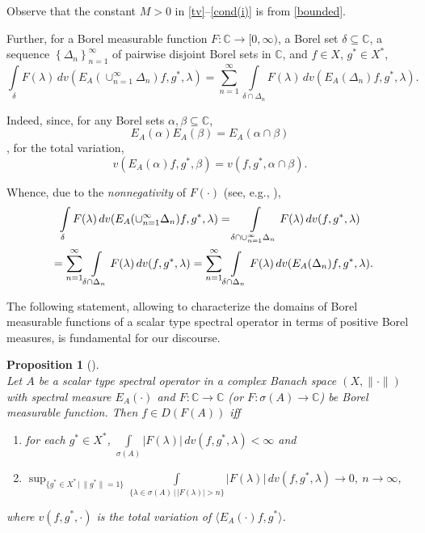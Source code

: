 \documentclass{amsart}
\theoremstyle{plain}
\newtheorem{prop}{Proposition}[section]
\theoremstyle{definition}
\begin{document}
Observe that the constant $M>0$ in \eqref{tv}--\eqref{cond(i)} is from 
\eqref{bounded}.

Further, for a Borel measurable function $F:{{\mathbb C}}\to [0,\infty)$, a Borel set $\delta\subseteq {{\mathbb C}}$, a sequence $\left\{\Delta_n\right\}_{n=1}^\infty$ 
of pairwise disjoint Borel sets in ${{\mathbb C}}$, and 
$f\in X$, $g^*\in X^*$,
\begin{equation}\label{decompose}
\int\limits_{\delta}F(\lambda)\,dv(E_A(\cup_{n=1}^\infty \Delta_n)f,g^*,\lambda)
=\sum_{n=1}^\infty \int\limits_{\delta\cap\Delta_n}F(\lambda)\,dv(E_A(\Delta_n)f,g^*,\lambda).
\end{equation}

Indeed, since, for any Borel sets $\alpha,\beta\subseteq {{\mathbb C}}$,
\begin{equation*}
E_A(\alpha)E_A(\beta)=E_A(\alpha\cap\beta)
\end{equation*}
\cite{Survey58,Dun-SchIII}, 
for the total variation,
\begin{equation*}
v(E_A(\alpha)f,g^*,\beta)=v(f,g^*,\alpha\cap\beta).
\end{equation*}

Whence, due to the {\it nonnegativity} of $F(\cdot)$ (see, e.g., \cite{Halmos}),
\begin{multline*}
\int\limits_\delta F(\lambda)\,dv(E_A(\cup_{n=1}^\infty \Delta_n)f,g^*,\lambda)
=\int\limits_{\delta\cap\cup_{n=1}^\infty \Delta_n}F(\lambda)\,dv(f,g^*,\lambda)
\\
\ \
=\sum_{n=1}^\infty \int\limits_{\delta\cap\Delta_n}F(\lambda)\,dv(f,g^*,\lambda)
=\sum_{n=1}^\infty \int\limits_{\delta\cap\Delta_n}F(\lambda)\,dv(E_A(\Delta_n)f,g^*,\lambda).
\hfill
\end{multline*}

The following statement, allowing to characterize the domains of Borel measurable functions of a scalar type spectral operator in terms of positive Borel measures, is fundamental for our discourse.

\begin{prop}[{\cite[Proposition $3.1$]{Markin2002(1)}}]\label{prop}\ \\
Let $A$ be a scalar type spectral operator in a complex Banach space $(X,\|\cdot\|)$ with spectral measure $E_A(\cdot)$ and $F:{{\mathbb C}}\to {{\mathbb C}}$ 
(or $F:\sigma(A)\to {{\mathbb C}}$) be Borel measurable function. 
Then $f\in D(F(A))$ iff
\begin{enumerate}
\item[(i)] for each $g^*\in X^*$, 
$\displaystyle \int\limits_{\sigma(A)} |F(\lambda)|\,d v(f,g^*,\lambda)<\infty$ and
\item[(ii)] $\displaystyle \sup_{\{g^*\in X^*\,|\,\|g^*\|=1\}}
\int\limits_{\{\lambda\in\sigma(A)\,|\,|F(\lambda)|>n\}}
|F(\lambda)|\,dv(f,g^*,\lambda)\to 0,\ n\to\infty$,
\end{enumerate}
where $v(f,g^*,\cdot)$ is the total variation of $\langle E_A(\cdot)f,g^* \rangle$.
\end{prop} 
\end{document}
